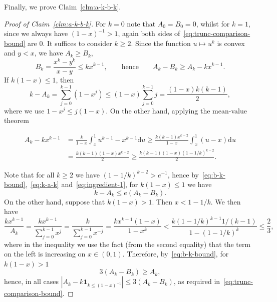 \documentclass[12pt]{article}
\theoremstyle{definition}
\newcommand{\dd}{\mathrm{d}}
\begin{document}
Finally, we prove Claim~\ref{clm:a-k-b-k}. 
\begin{proof}[Proof of Claim~\ref{clm:a-k-b-k}]
For $k=0$ note that $A_0 = B_0 = 0$, whilst for $k=1$, since we always have $(1-x)^{-1} > 1$, again both sides of~\eqref{eq:trunc-comparison-bound} are $0$. It suffices to consider $k \geq 2$. 
Since the function $u\mapsto u^k$ is convex and $y<x$, we have $A_{k} \geq B_{k}$, 
\begin{equation} \label{eq:b-k-bound}
B_k=\frac{x^k-y^k}{x-y}\leq kx^{k-1},
\qquad\text{hence}\qquad
A_k-B_k\geq A_k-kx^{k-1}.
\end{equation}
If $k(1-x) \leq 1$, then 
\begin{equation} \label{eq:k-a-k}
k - A_{k} = \sum_{j=0}^{k-1} (1- x^{j}) \leq (1-x) \sum_{j=0}^{k-1} j = \frac{(1-x)k(k-1)}{2}, 
\end{equation}
where we use $1 - x^{j} \leq j(1-x)$. 
On the other hand, applying the mean-value theorem
\begin{linenomath}
\begin{align} \label{eq:ingredient-1}
\nonumber  A_{k} - kx^{k-1} & = \frac{k}{1-x}\int_{x}^{1} u^{k-1} - x^{k-1} \dd u \geq \frac{k(k-1)x^{k-2}}{1-x} \int_{x}^{1} (u-x) \dd u \\ & = \frac{k(k-1)(1-x)x^{k-2}}{2}   \geq \frac{k(k-1)(1-x)\left(1 - 1/k\right)^{k-2}}{2}.  
\end{align}
\end{linenomath}
Note that for all $k \geq 2$ we have $(1-1/k)^{k-2} > e^{-1}$, hence by~\eqref{eq:b-k-bound},~\eqref{eq:k-a-k} and~\eqref{eq:ingredient-1}, for $k(1-x) \leq 1$ we have   
\begin{equation} \label{eq:case-1-annoying}
k-A_{k} \leq e(A_{k} - B_{k}).
\end{equation}
On the other hand, suppose that $k(1-x)>1$. Then $x<1-1/k$. We then have
\[
\frac{kx^{k-1}}{A_k}
=
\frac{kx^{k-1}}{\sum_{j=0}^{k-1}x^j}
=
\frac{k}{\sum_{j=0}^{k-1}x^{-j}} = \frac{kx^{k-1}(1-x)}{1-x^{k}} < \frac{k (1-1/k)^{k-1}1/(k-1)}{1 - (1-1/k)^{k}} \leq \frac{2}{3}, 
\]
where in the inequality we use the fact (from the second equality) that the term on the left is increasing on $x \in (0,1)$. 
Therefore, by~\eqref{eq:b-k-bound}, for $k(1-x) > 1$
\[
3(A_{k} - B_{k}) \geq A_{k},
\]
hence, in all cases
$\left|A_k-k\mathbf 1_{{k\leq(1-x)^{-1}}}\right|
\leq
3(A_k-B_k)$, as required in~\eqref{eq:trunc-comparison-bound}.


\end{proof}
\end{document}
